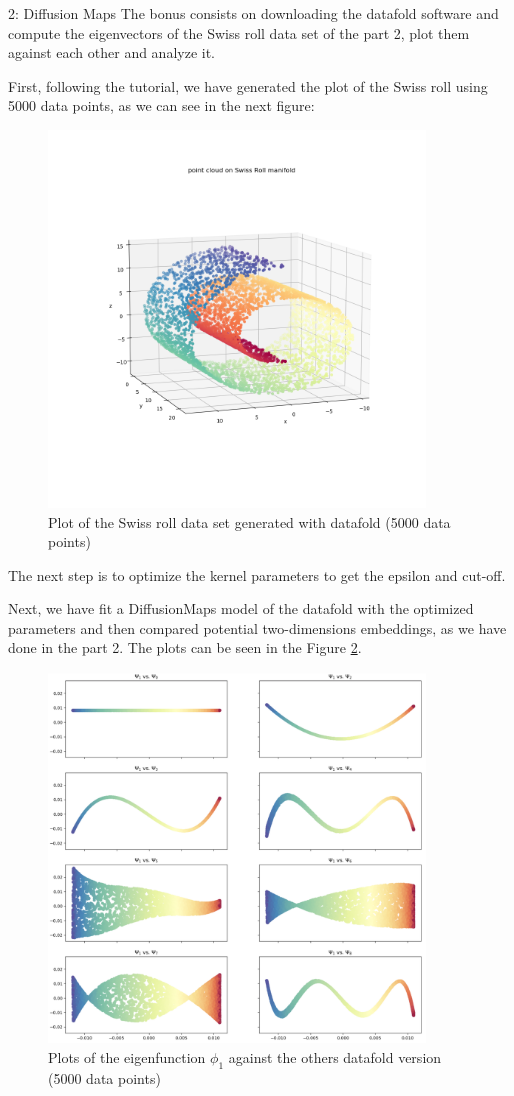 \documentclass[10pt,a4paper]{article}
\begin{document}
\begin{task}{2: Diffusion Maps}
The bonus consists on downloading the datafold software and compute the eigenvectors of the Swiss roll data set of the part 2, plot them against each other and analyze it. 

First, following the tutorial, we have generated the plot of the Swiss roll using 5000 data points, as we can see in the next figure:

\begin{figure} [H]
    \centering
    \includegraphics[width=10cm]{images/Swiss_plot_datafold.png}
    \caption{Plot of the Swiss roll data set generated with datafold (5000 data points)}
    \label{fig:bonus-1}
\end{figure}

The next step is to optimize the kernel parameters to get the epsilon and cut-off.

Next, we have fit a DiffusionMaps model of the datafold with the optimized parameters and then compared potential two-dimensions embeddings, as we have done in the part 2. The plots can be seen in the Figure \ref{fig:bonus-2}.

\begin{figure} [H]
    \centering
    \includegraphics[width=10cm]{images/plots.png}
    \caption{Plots of the eigenfunction \(\phi_1\) against the others datafold version (5000 data points)}
    \label{fig:bonus-2}
\end{figure}


\end{task}
\end{document}
